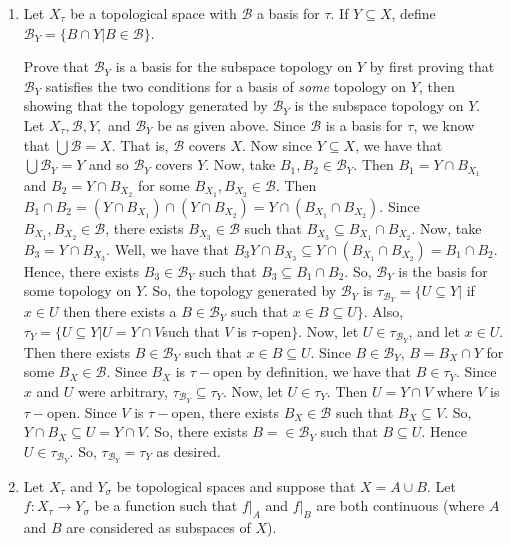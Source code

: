 \documentclass[12pt]{article}
\begin{document}
\begin{enumerate}
\item Let $X_{\tau}$ be a topological space with $\mathcal{B}$ a basis for $\tau$. If $Y\subseteq X$, define $\mathcal{B}_Y = \{B\cap Y|B\in \mathcal{B}\}$.

Prove that $\mathcal{B}_Y$ is a basis for the subspace topology on $Y$ by first proving that $\mathcal{B}_Y$ satisfies the two conditions for a basis of \textit{some} topology on $Y$, then showing that the topology generated by $\mathcal{B}_Y$ is the subspace topology on $Y$.\\

Let $X_{\tau}, \mathcal{B}, Y,$ and $\mathcal{B}_Y$ be as given above. Since $\mathcal{B}$ is a basis for $\tau$, we know that $\bigcup\mathcal{B}=X$. That is, $\mathcal{B}$ covers $X$. Now since $Y\subseteq X$, we have that $\bigcup\mathcal{B}_Y=Y$ and so $\mathcal{B}_Y$ covers $Y$. Now, take $B_1,B_2\in\mathcal{B}_Y$. Then $B_1=Y\cap B_{X_1}$ and $B_2=Y\cap B_{X_2}$ for some $B_{X_1}, B_{X_2}\in\mathcal{B}$. Then $B_1\cap B_2=(Y\cap B_{X_1})\cap(Y\cap B_{X_2})=Y\cap(B_{X_1}\cap B_{X_2})$. Since $B_{X_1},B_{X_2}\in\mathcal{B}$, there exists $B_{X_3}\in\mathcal{B}$ such that $B_{X_3}\subseteq B_{X_1}\cap B_{X_2}$. Now, take $B_3=Y\cap B_{X_3}$. Well, we have that $B_3Y\cap B_{X_3}\subseteq Y\cap(B_{X_1}\cap B_{X_2})=B_1\cap B_2$. Hence, there exists $B_3\in\mathcal{B}_Y$ such that $B_3\subseteq B_1\cap B_2$. So, $\mathcal{B}_Y$ is the basis for some topology on $Y$. So, the topology generated by $\mathcal{B}_Y$ is $\tau_{\mathcal{B}_Y}=\{U\subseteq Y|$ if $x\in U$ then there exists a $B\in\mathcal{B}_Y$ such that $x\in B\subseteq U\}$. Also, $\tau_Y=\{U\subseteq Y|U=Y\cap V$such that $V$ is $\tau$-open$\}$. Now, let $U\in\tau_{\mathcal{B}_Y}$, and let $x\in U$. Then there exists $B\in\mathcal{B}_Y$ such that $x\in B\subseteq U$. Since $B\in\mathcal{B}_Y$, $B=B_X\cap Y$ for some $B_X\in\mathcal{B}$. Since $B_X$ is $\tau-$open by definition, we have that $B\in\tau_Y$. Since $x$ and $U$ were arbitrary, $\tau_{\mathcal{B}_Y}\subseteq\tau_Y$. Now, let $U\in\tau_Y$. Then $U=Y\cap V$ where $V$ is $\tau-$open. Since $V$ is $\tau-$open, there exists $B_X\in\mathcal{B}$ such that $B_X\subseteq V$. So, $Y\cap B_X\subseteq U=Y\cap V$. So, there exists $B=\in\mathcal{B}_Y$ such that $B\subseteq U$. Hence $U\in\tau_{\mathcal{B}_Y}$. So, $\tau_{\mathcal{B}_Y}=\tau_Y$ as desired.

\item Let $X_{\tau}$ and $Y_{\sigma}$ be topological spaces and suppose that $X=A\cup B$. Let $f: X_{\tau}\to Y_{\sigma}$ be a function such that $f|_A$ and $f|_B$ are both continuous (where $A$ and $B$ are considered as subspaces of $X$).


\end{enumerate}
\end{document}
